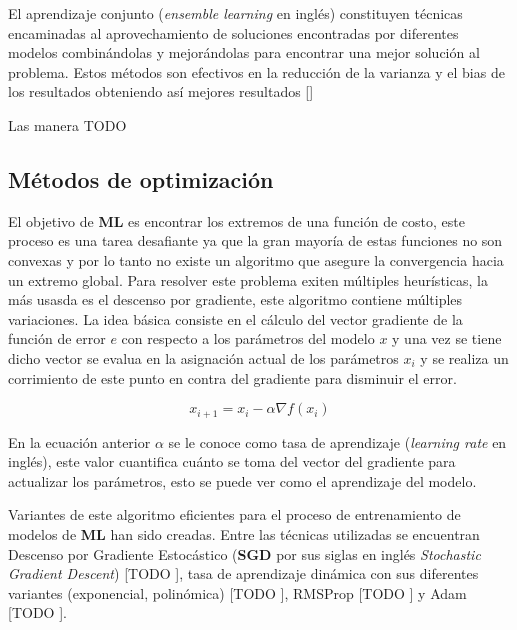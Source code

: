 El aprendizaje conjunto (\emph{ensemble learning} en inglés) constituyen técnicas encaminadas al aprovechamiento
de soluciones encontradas por diferentes modelos combinándolas y mejorándolas para encontrar una mejor solución 
al problema. Estos métodos son efectivos en la reducción de la varianza y el bias de los resultados obteniendo así
mejores resultados [\cite{dietterich2002ensemble}] 

Las manera TODO

\subsection{Métodos de optimización}


El objetivo de \textbf{ML} es encontrar los extremos de una función de costo, este proceso es una tarea 
desafiante ya que la gran mayoría de estas funciones no son convexas y por lo tanto no existe un algoritmo
que asegure la convergencia hacia un extremo global. Para resolver este problema exiten múltiples heurísticas,
la más usasda es el descenso por gradiente, este algoritmo contiene múltiples variaciones. La idea básica consiste 
en el cálculo del vector gradiente de la función de error $e$ con respecto a los parámetros del modelo $x$ y una vez se 
tiene dicho vector se evalua en la asignación actual de los parámetros $x_i$ y se realiza un corrimiento de este punto 
en contra del gradiente para disminuir el error.

\begin{equation}
	x_{i+1} = x_i - \alpha \nabla f(x_i)
\end{equation}\label{eq:gradien_descent}

En la ecuación anterior $\alpha$ se le conoce como tasa de aprendizaje (\emph{learning rate} en inglés),
este valor cuantifica cuánto se toma del vector del gradiente para actualizar los parámetros, esto 
se puede ver como el aprendizaje del modelo.

Variantes de este algoritmo eficientes para el proceso de entrenamiento de modelos de \textbf{ML} han sido 
creadas. Entre las técnicas utilizadas se encuentran Descenso por Gradiente Estocástico (\textbf{SGD} por sus siglas 
en inglés \emph{Stochastic Gradient Descent}) [TODO \cite{}], tasa de aprendizaje dinámica con sus diferentes
variantes (exponencial, polinómica) [TODO \cite{}], RMSProp [TODO \cite{}] y Adam [TODO \cite{}]. 

